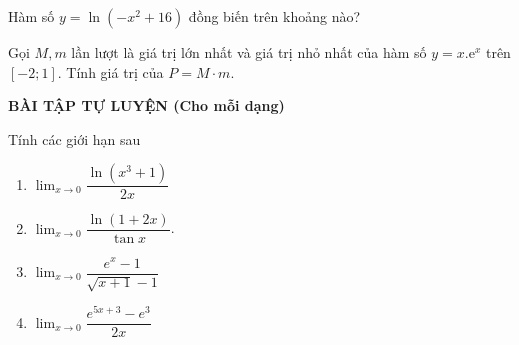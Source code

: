 \begin{vd}%
Hàm số $y=\ln\left(-x^2+16\right)$ đồng biến trên khoảng nào?
\end{vd}
\begin{vd}
Gọi $M, m$ lần lượt là giá trị lớn nhất và giá trị nhỏ nhất của hàm số $y=x.\mathrm{e}^x$ trên $[-2;1]$. Tính giá trị của $P=M \cdot m$.
\end{vd}
\begin{center}
\textbf{BÀI TẬP TỰ LUYỆN (Cho mỗi dạng)}
\end{center}
\begin{bt}%
Tính các giới hạn sau
\begin{enumerate}
        \item $\displaystyle \lim_{x \to 0} \dfrac{\ln(x^3+1)}{2x}$ 
        \item $\displaystyle \lim_{x \to 0}\dfrac{\ln(1+2x)}{\tan x}$.
        \item $\displaystyle \lim_{x \to 0}\dfrac{e^x -1}{\sqrt{x+1}- 1}$
        \item $\displaystyle \lim_{x \to 0}\dfrac{e^{5x+3}-e^3}{2x}$
    \end{enumerate}
\end{bt}
